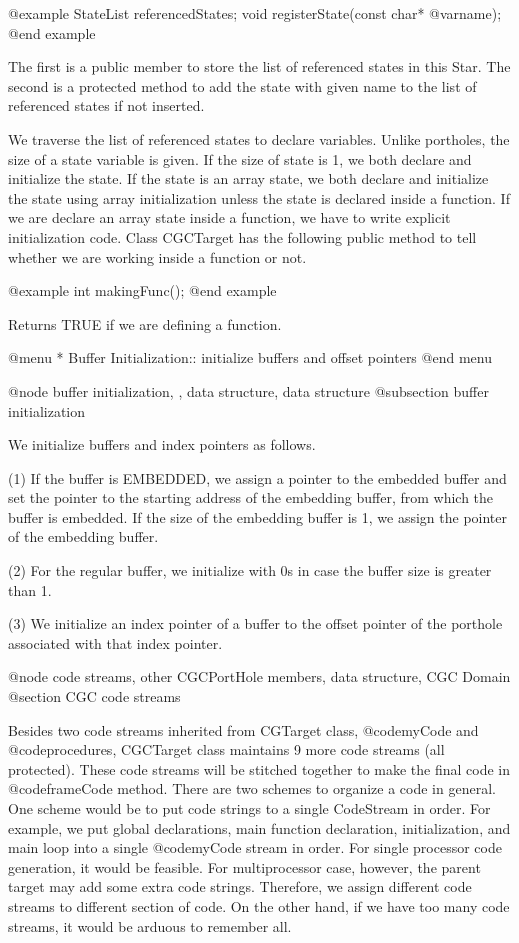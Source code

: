 {@example
StateList referencedStates;
void registerState(const char* @var{name});
@end example

The first is a public member to store the list of referenced states in this
Star. The second is a protected method to add the state with given name to
the list of referenced states if not inserted.

We traverse the list of referenced states to declare variables. Unlike
portholes, the size of a state variable is given. If the size of state is 1,
we both declare and initialize the state. If the state is an array state,
we both declare and initialize the state using array initialization unless
the state is declared inside a function. If we are declare an array state
inside a function, we have to write explicit initialization code.
Class CGCTarget has the following public method to tell whether we are
working inside a function or not.

@example
int makingFunc();
@end example

Returns TRUE if we are defining a function.

@menu
* Buffer Initialization::		initialize buffers and offset pointers
@end menu

@node buffer initialization, , data structure, data structure
@subsection buffer initialization

We initialize buffers and index pointers as follows.

(1) If the buffer is EMBEDDED, we assign a pointer to the embedded 
buffer and set the pointer
to the starting address of the embedding buffer, from which the buffer
is embedded. If the size of the embedding
buffer is 1, we assign the pointer of the embedding buffer.

(2) For the regular buffer, we initialize with 0s in case the buffer size is
greater than 1.

(3) We initialize an index pointer of a buffer to the offset pointer of
the porthole associated with that index pointer.

@node code streams, other CGCPortHole members, data structure, CGC Domain
@section CGC code streams

Besides two code streams inherited from CGTarget class, @code{myCode} and
@code{procedures}, CGCTarget class maintains 9 more code streams (all
protected). These
code streams will be stitched together to make the final code in
@code{frameCode} method. There are two schemes to organize a code in general.
One scheme would be to put code strings to a single CodeStream in order.
For example, we put global declarations, main function declaration, 
initialization, and main loop into a single @code{myCode} stream in order.
For single processor code generation, it would be feasible. For
multiprocessor case, however, the parent target may add some extra code
strings. Therefore, we assign different code streams to different
section of code. On the other hand, if we have too many code streams,
it would be arduous to remember all. 

}

